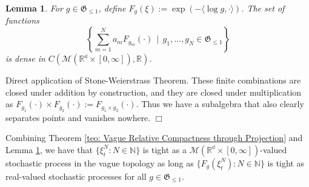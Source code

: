 \documentclass[12pt]{article}
\newenvironment {proof}{{\noindent\bf Proof }}{\hfill $\Box$ \medskip}
\newtheorem{lemma}[theorem]{Lemma}
\newcommand{\IR}{\mathbb R}
\begin{document}
\begin{lemma}\label{lem: Dense set for test functions on empirical measures} For $g \in \mathfrak{G}_{\leq 1}$, define $F_g(\xi):= \exp(-\langle \log g, \cdot \rangle )$. The set of functions 
$$\left\{\sum_{m=1}^{N}a_m F_{g_m}(\cdot) ~~|~~ g_1,...,g_N \in \mathfrak{G}_{\leq 1}\right\}$$
is dense in $C(\mathcal{M}(\mathbb{R^d} \times [0, \infty]),\IR)$.
\end{lemma}
\begin{proof}
Direct application of Stone-Weierstrass Theorem. These finite combinations are closed under addition by construction, and they are closed under multiplication as $F_{g_1}(\cdot) \times F_{g_2}(\cdot):=F_{g_1 \times g_2}(\cdot)$. Thus we have a subalgebra that also clearly separates points and vanishes nowhere.
\end{proof}


Combining Theorem \ref{teo: Vague Relative Compactness through Projection} and Lemma \ref{lem: Dense set for test functions on empirical measures}, we have that $\{\xi^N_t: N \in \mathbb{N}\}$ is tight as a $\mathcal{M}(\mathbb{R^d} \times [0, \infty])$-valued stochastic process in the vague topology as long as $\{F_g(\xi^N_t): N \in \mathbb{N}\}$ is tight as real-valued stochastic processes
for all $g \in \mathfrak{G}_{\leq 1}$. 


\end{document}
